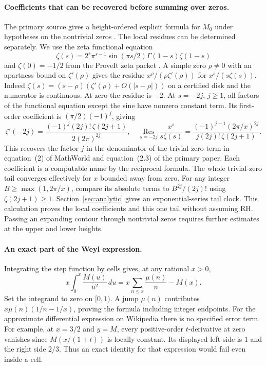 \paragraph{Coefficients that can be recovered before summing over zeros.}
The primary source gives a height-ordered explicit formula for $M_0$ under hypotheses on the nontrivial zeros \cite[eq.~(2.3)]{ot}. The local residues can be determined separately. We use the zeta functional equation
\[
 \zeta(s)=2^s\pi^{s-1}\sin(\pi s/2)\Gamma(1-s)\zeta(1-s)
\]
and $\zeta(0)=-1/2$ from the ProveIt zeta packet \cite{zeta}. A simple zero $\rho\ne0$ with an apartness bound on $\zeta'(\rho)$ gives the residue $x^\rho/(\rho\zeta'(\rho))$ for $x^s/(s\zeta(s))$. Indeed $\zeta(s)=(s-\rho)(\zeta'(\rho)+O(|s-\rho|))$ on a certified disk and the numerator is continuous. At zero the residue is $-2$. At $s=-2j$, $j\ge1$, all factors of the functional equation except the sine have nonzero constant term. Its first-order coefficient is $(\pi/2)(-1)^j$, giving
\[
 \zeta'(-2j)=\frac{(-1)^j(2j)!\,\zeta(2j+1)}{2(2\pi)^{2j}},
 \quad
 \operatorname*{Res}_{s=-2j}\frac{x^s}{s\zeta(s)}
  =\frac{(-1)^{j-1}(2\pi/x)^{2j}}{j(2j)!\,\zeta(2j+1)}.
\]
This recovers the factor $j$ in the denominator of the trivial-zero term in equation~(2) of MathWorld and equation~(2.3) of the primary paper. Each coefficient is a computable name by the reciprocal formula. The whole trivial-zero tail converges effectively for $x$ bounded away from zero. For any integer $B\ge\max(1,2\pi/x)$, compare its absolute terms to $B^{2j}/(2j)!$ using $\zeta(2j+1)\ge1$. Section~\ref{sec:analytic} gives an exponential-series tail clock. This calculation proves the local coefficients and this one tail without assuming RH. Passing an expanding contour through nontrivial zeros requires further estimates at the upper and lower heights.

\paragraph{An exact part of the Weyl expression.}
Integrating the step function by cells gives, at any rational $x>0$,
\[
 x\int_0^x\frac{M(u)}{u^2}\,du
     =x\sum_{n\le x}\frac{\mu(n)}n-M(x).
\]
Set the integrand to zero on $[0,1)$. A jump $\mu(n)$ contributes $x\mu(n)(1/n-1/x)$, proving the formula including integer endpoints. For the approximate differential expression on Wikipedia there is no specified error term. For example, at $x=3/2$ and $y=M$, every positive-order $t$-derivative at zero vanishes since $M(x/(1+t))$ is locally constant. Its displayed left side is $1$ and the right side $2/3$. Thus an exact identity for that expression would fail even inside a cell.

